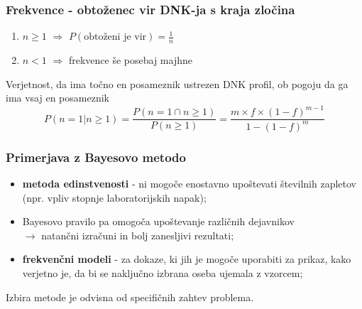 \documentclass{beamer}
\begin{document}
\begin{frame}
    \frametitle{Frekvence - obtoženec vir DNK-ja s kraja zločina}
    \begin{enumerate}
        \item $n \ge 1$ $\Rightarrow$ $P(\text{obtoženi je vir})=\frac{1}{n}$
        \item $n < 1$ $\Rightarrow$ frekvence še posebaj majhne
    \end{enumerate} \vspace{3mm}
    \begin{block}{Verjetnost, da ima točno en posameznik ustrezen DNK profil, ob pogoju da ga ima vsaj en posameznik}
        \[
            P(n = 1 \lvert n \ge 1) = \frac{P(n=1 \cap n \ge 1)}{P(n \ge 1)} = \frac{m \times f \times (1 - f)^{m-1}}{1 - (1 - f)^m}
        \]
    \end{block}
\end{frame}

\begin{frame}
    \frametitle{Primerjava z Bayesovo metodo}
    \begin{itemize}
        \item \textbf{metoda edinstvenosti} - ni mogoče enostavno upoštevati številnih zapletov (npr. vpliv stopnje laboratorijskih napak);
        \item Bayesovo pravilo pa omogoča upoštevanje različnih dejavnikov\\ $\rightarrow$ natančni izračuni in bolj zanesljivi rezultati;
        \item \textbf{frekvenčni modeli} - za dokaze, ki jih je mogoče uporabiti za prikaz, kako verjetno je, da bi se naključno izbrana oseba ujemala z vzorcem;
    \end{itemize} \vspace{3mm}
    \begin{block}{}
        \centering
        Izbira metode je odvisna od specifičnih zahtev problema.
    \end{block}
\end{frame}
\end{document}
